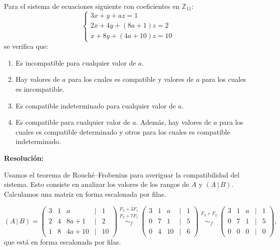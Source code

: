 \documentclass[a4paper,12pt]{article}
\begin{document}
\begin{ejercicio}[title=Ejercicio 29]
Para el sistema de ecuaciones siguiente con coeficientes en $\mathbb{Z}_{11}$:
\[
\begin{cases}
3x + y + a z = 1\\
2x + 4y + (8a + 1)z = 2\\
x + 8y + (4a + 10)z = 10
\end{cases}
\]
se verifica que:

\begin{enumerate}
\item[a)] Es incompatible para cualquier valor de $a$.
\item[b)] Hay valores de $a$ para los cuales es compatible y valores de $a$ para los cuales es incompatible.
\item[c)] Es compatible indeterminado para cualquier valor de $a$.
\item[d)] Es compatible para cualquier valor de $a$. Además, hay valores de $a$ para los cuales es compatible determinado y otros para los cuales es compatible indeterminado.
\end{enumerate}

\tcblower
\textbf{Resolución:}

Usamos el teorema de Rouché–Frobenius para averiguar la compatibilidad del sistema. Esto consiste en analizar los valores de los rangos de $A$ y $(A\,|\,B)$. Calculamos una matriz en forma escalonada por filas.

\[
(A\,|\,B)=
\begin{pmatrix}
3 & 1 & a &\Big|& 1\\
2 & 4 & 8a+1 &\Big|& 2\\
1 & 8 & 4a+10 &\Big|& 10
\end{pmatrix}
\overset{\substack{F_2+3F_1\\F_3+7F_1}}{\sim_f}
\begin{pmatrix}
3 & 1 & a &\Big|& 1\\
0 & 7 & 1 &\Big|& 5\\
0 & 4 & 10 &\Big|& 6
\end{pmatrix}
\overset{\substack{F_3+F_2\\{}}}{\sim_f}
\begin{pmatrix}
3 & 1 & a &\Big|& 1\\
0 & 7 & 1 &\Big|& 5\\
0 & 0 & 0 &\Big|& 0
\end{pmatrix},
\]
que está en forma escalonada por filas.

\vspace{1em}


\end{ejercicio}
\end{document}
